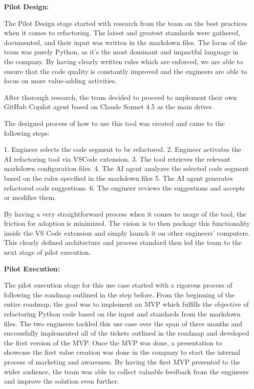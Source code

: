 \documentclass[]{imc-inf}
\begin{document}
\textbf{Pilot Design:}

The Pilot Design stage started with research from the team on the best practices when it comes to refactoring. The latest and greatest standards were gathered, documented, and their input was written in the markdown files. The focus of the team was purely Python, as it's the most dominant and impactful language in the company. By having clearly written rules which are enforced, we are able to ensure that the code quality is constantly improved and the engineers are able to focus on more value-adding activities.

After thorough research, the team decided to proceed to implement their own GitHub Copilot agent based on Claude Sonnet 4.5 as the main driver. 

The designed process of how to use this tool was created and came to the following steps:

1. Engineer selects the code segment to be refactored.
2. Engineer activates the AI refactoring tool via VSCode extension.
3. The tool retrieves the relevant markdown configuration files.
4. The AI agent analyzes the selected code segment based on the rules specified in the markdown files
5. The AI agent generates refactored code suggestions.
6. The engineer reviews the suggestions and accepts or modifies them.


By having a very straightforward process when it comes to usage of the tool, the friction for adoption is minimized. 
The vision is to then package this functionality inside the VS Code extension and simply launch it on other engineers' computers. 
This clearly defined architecture and process standard then led the team to the next stage of pilot execution.

\textbf{Pilot Execution:}

The pilot execution stage for this use case started with a rigorous process of following the roadmap outlined in the step before. From the beginning of the entire roadmap, the goal was to implement an MVP which fulfills the objective of refactoring Python code based on the input and standards from the markdown files.
The two engineers tackled this use case over the span of three months and successfully implemented all of the tickets outlined in the roadmap and developed the first version of the MVP.
Once the MVP was done, a presentation to showcase the first value creation was done in the company to start the internal process of marketing and awareness. By having the first MVP presented to the wider audience, the team was able to collect valuable feedback from the engineers and improve the solution even further.
\end{document}

